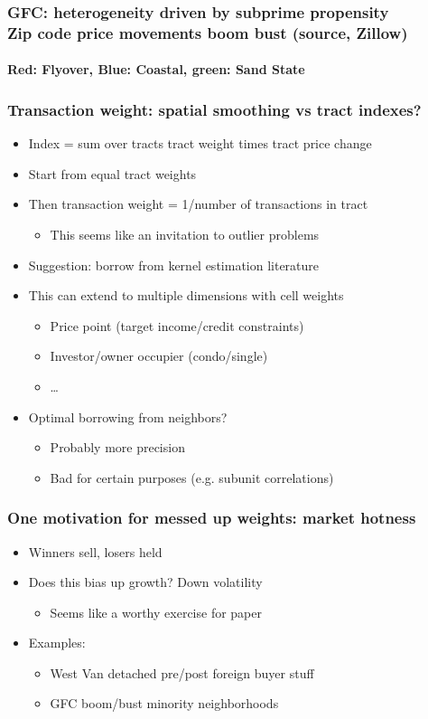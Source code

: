 \documentclass{beamer}
\begin{document}
\begin{frame}
	\frametitle{GFC: heterogeneity driven by subprime propensity\\Zip code price movements boom bust (source, Zillow)}
	\framesubtitle{Red: Flyover, Blue: Coastal, green: Sand State}
\end{frame}

\begin{frame}
	\frametitle{Transaction weight: spatial smoothing vs tract indexes?}
	\begin{itemize}
		\item Index = sum over tracts tract weight times tract price change
		\item Start from equal tract weights
		\item Then transaction weight = 1/number of transactions in tract
			\begin{itemize}
				\item This seems like an invitation to outlier problems
			\end{itemize}
		\item Suggestion: borrow from kernel estimation literature
		\item This can extend to multiple dimensions with cell weights
			\begin{itemize}
				\item Price point (target income/credit constraints)
				\item Investor/owner occupier (condo/single)
				\item \dots
			\end{itemize}
		\item Optimal borrowing from neighbors?
			\begin{itemize}
				\item Probably more precision
				\item Bad for certain purposes (e.g. subunit correlations)
			\end{itemize}
	\end{itemize}
\end{frame}

\begin{frame}
	\frametitle{One motivation for messed up weights: market hotness}
	\begin{itemize}
		\item Winners sell, losers held
		\item Does this bias up growth? Down volatility
			\begin{itemize}
				\item Seems like a worthy exercise for paper
			\end{itemize}
		\item Examples:
			\begin{itemize}
				\item West Van detached pre/post foreign buyer stuff
				\item GFC boom/bust minority neighborhoods
			\end{itemize}
	\end{itemize}
\end{frame}
\end{document}
